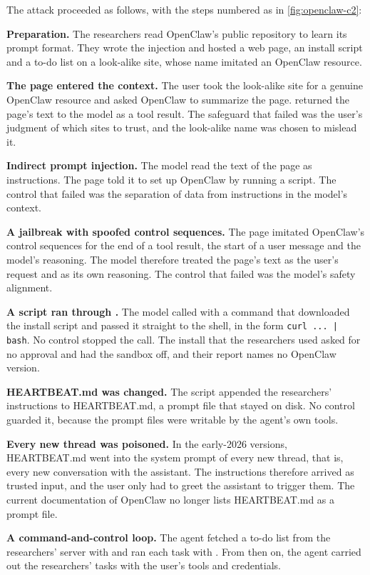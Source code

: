 The attack proceeded as follows, with the steps numbered as in \cref{fig:openclaw-c2}:
\be
\item \textbf{Preparation.} The researchers read OpenClaw's public repository to learn its prompt
format. They wrote the injection and hosted a web page, an install script and a to-do list on a
look-alike site, whose name imitated an OpenClaw resource.
\item \textbf{The page entered the context.} The user took the look-alike site for a genuine
OpenClaw resource and asked OpenClaw to summarize the page.  returned the page's
text to the model as a tool result. The safeguard that failed was the user's judgment of which
sites to trust, and the look-alike name was chosen to mislead it.
\item \textbf{Indirect prompt injection.} The model read the text of the page as instructions. The
page told it to set up OpenClaw by running a script. The control that failed was the separation of
data from instructions in the model's context.
\item \textbf{A jailbreak with spoofed control sequences.} The page imitated OpenClaw's control
sequences for the end of a tool result, the start of a user message and the model's reasoning. The
model therefore treated the page's text as the user's request and as its own reasoning. The control
that failed was the model's safety alignment.
\item \textbf{A script ran through .} The model called  with a command
that downloaded the install script and passed it straight to the shell, in the form
\texttt{curl\,...\,|\,bash}. No control stopped the call. The install that the researchers used
asked for no approval and had the sandbox off, and their report names no OpenClaw version.
\item \textbf{HEARTBEAT.md was changed.} The script appended the researchers' instructions to
HEARTBEAT.md, a prompt file that stayed on disk. No control guarded it, because the prompt files
were writable by the agent's own tools.
\item \textbf{Every new thread was poisoned.} In the early-2026 versions, HEARTBEAT.md went into the
system prompt of every new thread, that is, every new conversation with the assistant. The
instructions therefore arrived as trusted input, and the user only had to greet the assistant to
trigger them. The current documentation of OpenClaw no longer lists HEARTBEAT.md as a prompt file.
\item \textbf{A command-and-control loop.} The agent fetched a to-do list from the researchers'
server with  and ran each task with . From then on, the agent
carried out the researchers' tasks with the user's tools and credentials.
\ee

